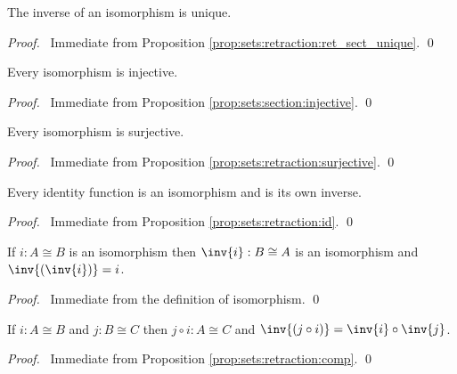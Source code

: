 \begin{prop}
The inverse of an isomorphism is unique.
\end{prop}

\begin{proof}
\pf\ Immediate from Proposition \ref{prop:sets:retraction:ret_sect_unique}. \qed
\end{proof}

\begin{prop}
Every isomorphism is injective.
\end{prop}

\begin{proof}
\pf\ Immediate from Proposition \ref{prop:sets:section:injective}. \qed
\end{proof}

\begin{prop}
Every isomorphism is surjective.
\end{prop}

\begin{proof}
\pf\ Immediate from Proposition \ref{prop:sets:retraction:surjective}. \qed
\end{proof}

\begin{prop}
\label{prop:sets:isomorphism:identity}
Every identity function is an isomorphism and is its own inverse.
\end{prop}

\begin{proof}
\pf\ Immediate from Proposition \ref{prop:sets:retraction:id}. \qed
\end{proof}

\begin{prop}
\label{prop:sets:isomorphism:inverse}
If $i : A \cong B$ is an isomorphism then $\inv{i} : B \cong A$ is an
isomorphism and $\inv{(\inv{i})} = i$.
\end{prop}

\begin{proof}
\pf\ Immediate from the definition of isomorphism. \qed
\end{proof}

\begin{prop}
  \label{prop:sets:isomorphism:comp}
If $i : A \cong B$ and $j : B \cong C$ then $j \circ i : A \cong C$ and
$\inv{(j \circ i)} = \inv{i} \circ \inv{j}$.
\end{prop}

\begin{proof}
\pf\ Immediate from Proposition \ref{prop:sets:retraction:comp}. \qed
\end{proof}

